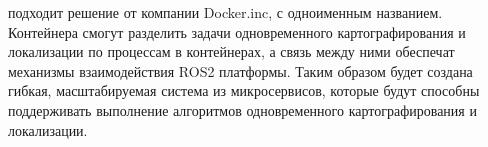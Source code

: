 \documentclass[a4paper, 14pt]{extreport}
\begin{document}
 подходит решение от компании Docker.inc, с одноименным названием. Контейнера смогут разделить задачи одновременного картографирования 
 и локализации по процессам в контейнерах, а связь между ними обеспечат механизмы взаимодействия ROS2 платформы. Таким образом будет
 создана гибкая, масштабируемая система из микросервисов, которые будут способны поддерживать выполнение алгоритмов одновременного 
 картографирования и локализации.   
\end{document}
